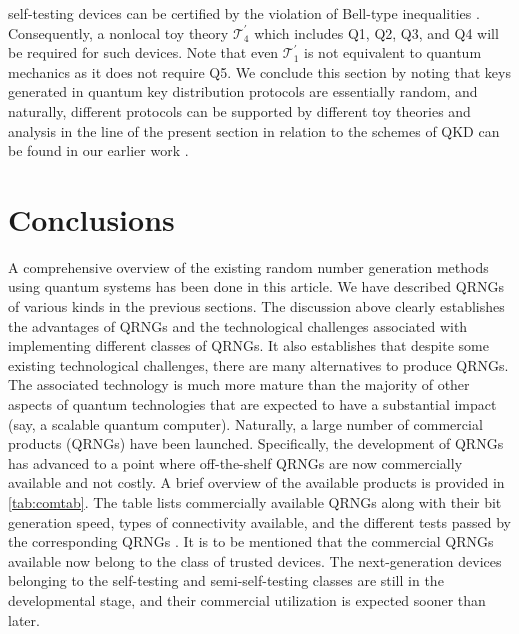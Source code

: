 \documentclass[]{interact}
\theoremstyle{plain}%
\theoremstyle{definition}
\theoremstyle{remark}
\begin{document}
self-testing devices can be certified by the violation of Bell-type inequalities \cite{clauser1969proposed}. Consequently, a nonlocal toy theory $\mathcal{T}_{4}^{\prime}$ which includes Q1, Q2, Q3, and Q4 will be required for such devices. Note that even $\mathcal{T}_{1}^{\prime}$ is not equivalent to quantum mechanics as it does not require Q5. We conclude this section by noting that keys generated in quantum key distribution protocols are essentially random, and naturally, different protocols can be supported by different toy theories and analysis in the line of the present section in relation to the schemes of QKD can be found in our earlier work \cite{aravinda2019hierarchical,aravinda2017origin}.


\section{Conclusions\label{sec:conclusions}}

A comprehensive overview of the existing random number generation methods using quantum systems has been done in this article. We have described QRNGs of various kinds in the previous sections. The discussion above clearly establishes the advantages of QRNGs and the technological challenges associated with implementing different classes of QRNGs. It also establishes that despite some existing technological challenges, there are many alternatives to produce QRNGs. The associated technology is much more mature than the majority of other aspects of quantum technologies that are expected to have a substantial impact (say, a scalable quantum computer). Naturally, a large number of commercial products (QRNGs) have been launched. Specifically,  the development of QRNGs has advanced to a point where off-the-shelf QRNGs are now commercially available and not costly. A brief overview of the available products is provided in \autoref{tab:comtab}. The table lists commercially available QRNGs along with their bit generation speed, types of connectivity available, and the different tests passed by the corresponding QRNGs \cite{jacak2021quantum}. It is to be mentioned that the commercial QRNGs available now belong to the class of trusted devices. The next-generation devices belonging to the self-testing and semi-self-testing classes are still in the developmental stage, and their commercial utilization is expected sooner than later. 
\end{document}
